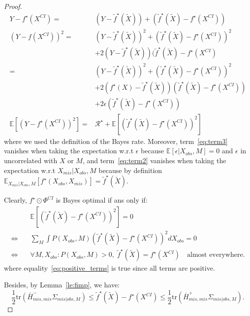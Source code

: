 \documentclass{article}
\newcommand{\E}{\mathbb{E}}
\newcommand{\Rcal}{\mathcal{R}}
\newcommand{\br}[1]{\left(#1\right)}
\newcommand{\sqb}[1]{\left[#1\right]}
\theoremstyle{plain}
\begin{document}
\begin{proof}
    \begin{align}
        Y - f^\star(X^{CI}) =& (Y - \tilde f^\star(\widetilde X)) + (\tilde f^\star(\widetilde X) - f^\star(X^{CI}))\\
        \br{Y - f(X^{CI})}^2 =& (Y - \tilde f^\star(\widetilde X))^2 + (\tilde f^\star(\widetilde X) - f^\star(X^{CI}))^2\\
        & + 2(Y - \tilde f^\star(\widetilde X))(\tilde f^\star(\widetilde X) - f^\star(X^{CI})\\
        =& (Y - \tilde f^\star(\widetilde X))^2 + (\tilde f^\star(\widetilde X) - f^\star(X^{CI}))^2\\
        & + 2(f^\star(X) - \tilde f^\star(\widetilde X))(\tilde f^\star(\widetilde X) - f^\star(X^{CI})) \label{eq:term2}\\
        & + 2\epsilon(\tilde f^\star(\widetilde X) - f^\star(X^{CI})) \label{eq:term3}\\
        \E\sqb{\br{Y - f^\star(X^{CI})}^2} =& \Rcal^\star + \E \sqb{\br{\tilde f^\star(\widetilde X) - f^\star(X^{CI})}^2} \label{eq:cofimp1}
    \end{align}
    where we used the definition of the Bayes rate. Moreover, term~\eqref{eq:term3} vanishes when taking the expectation w.r.t $\epsilon$ because $\E\sqb{\epsilon | X_{obs}, M} = 0$ and $\epsilon$ in uncorrelated with $X$ or $M$, and term~\eqref{eq:term2} vanishes when taking the expectation w.r.t $X_{mis}|X_{obs}, M$ because by definition $\E_{X_{mis}|X_{obs}, M} \sqb{f^\star(X_{obs}, X_{mis})}= \tilde f^\star(\widetilde X)$.
    
    Clearly, $f^\star \odot \Phi^{CI}$ is Bayes optimal if ans only if:
    \begin{align}
        &\quad \E \sqb{\br{\tilde f^\star(\widetilde X) - f^\star(X^{CI})}^2} = 0\\
        \iff &\quad \sum_{M} \int P(X_{obs}, M)\br{\tilde f^\star(\widetilde X) - f^\star(X^{CI})}^2 dX_{obs} = 0\\
        \iff &\quad \forall M, X_{obs}: P(X_{obs}, M)>0,\; \tilde f^\star(\widetilde X) = f^\star(X^{CI}) \quad \text{almost everywhere}. \label{eq:positive_terms}
    \end{align}
    where equality~\ref{eq:positive_terms} is true since all terms are positive.
    
    Besides, by Lemma~\ref{le:fimp}, we have:
    \begin{equation}
        \frac{1}{2}\text{tr}\left(\bar{H}^-_{mis, mis} \Sigma_{mis|obs, M}\right) \leq \tilde f^\star(\widetilde X) - f^\star(X^{CI}) \leq \frac{1}{2}\text{tr}\left(\bar{H}^+_{mis, mis} \Sigma_{mis|obs, M}\right).
    \end{equation}
    

\end{proof}
\end{document}
